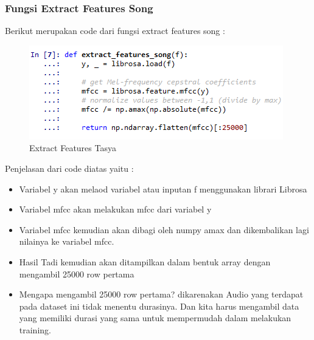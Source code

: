 \subsubsection{Fungsi Extract Features Song}
Berikut merupakan code dari fungsi extract features song :\\
\begin{figure}[ht]
\centering
\includegraphics[scale=0.5]{figures/chapter6tasya9.png}
\caption{Extract Features Tasya}
\label{Praktek}
\end{figure}
Penjelasan dari code diatas yaitu :
\begin{itemize}
\item Variabel y akan melaod variabel atau inputan f menggunakan librari Librosa
\item Variabel mfcc akan melakukan mfcc dari variabel y
\item Variabel mfcc kemudian akan dibagi oleh numpy amax dan dikembalikan lagi nilainya ke variabel mfcc.
\item Hasil Tadi kemudian akan ditampilkan dalam bentuk array dengan mengambil 25000 row pertama
\item Mengapa mengambil 25000 row pertama? dikarenakan Audio yang terdapat pada dataset ini tidak menentu durasinya. Dan kita harus mengambil data yang memiliki durasi yang sama untuk mempermudah dalam melakukan training.
\end{itemize}

